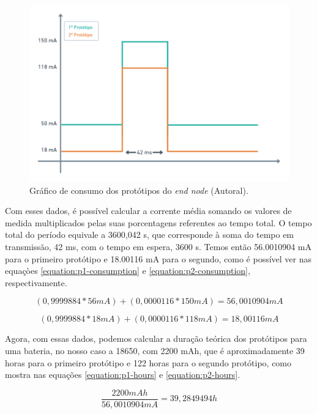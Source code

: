\begin{figure}[H]
  \centering
  \includegraphics[width=.80\textwidth]{assets/end-node-consumption-chart.png} 
  \caption{Gráfico de consumo dos protótipos do \textit{end node} (Autoral).}
  \label{fig:end-node-consumption-chart} 
\end{figure}

Com esses dados, é possível calcular a corrente média somando os valores de medida multiplicados pelas suas porcentagens referentes ao tempo total. O tempo total do período equivale a 3600,042 s, que corresponde à soma do tempo em transmissão, 42 ms, com o tempo em espera, 3600 s. Temos então 56.0010904 mA para o primeiro protótipo e 18.00116 mA para o segundo, como é possível ver nas equaçòes \ref{equation:p1-consumption} e \ref{equation:p2-consumption}, respectivamente.

\begin{equation}
  (0,9999884 * 56 mA) + (0,0000116 * 150 mA) = 56,0010904 mA
  \label{equation:p1-consumption} 
\end{equation}

\begin{equation}
  (0,9999884 * 18 mA) + (0,0000116 * 118 mA) = 18,00116 mA
  \label{equation:p2-consumption} 
\end{equation}

Agora, com essas dados, podemos calcular a duração teórica dos protótipos  para uma bateria, no nosso caso a 18650, com 2200 mAh, que é aproximadamente 39 horas para o primeiro protótipo e 122 horas para o segundo protótipo, como mostra nas equações \ref{equation:p1-hours} e \ref{equation:p2-hours}.

\begin{equation}
  \frac{2200 mAh}{56,0010904 mA} = 39,2849494 h
  \label{equation:p1-hours} 
\end{equation}

